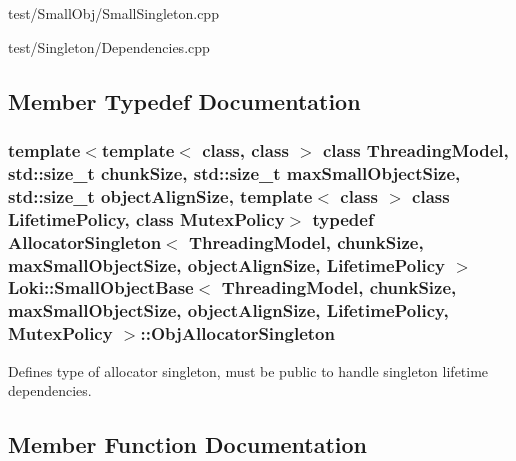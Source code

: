 \begin{DoxyItemize}
\item test/\+Small\+Obj/\+Small\+Singleton.\+cpp
\item test/\+Singleton/\+Dependencies.\+cpp 
\end{DoxyItemize}

\subsection{Member Typedef Documentation}
\hypertarget{classLoki_1_1SmallObjectBase_ad07df1c9ec9c41580e07e32eddcda82d}{}
\subsubsection[{Obj\+Allocator\+Singleton}]{\setlength{\rightskip}{0pt plus 5cm}template$<$template$<$ class, class $>$ class Threading\+Model, std\+::size\+\_\+t chunk\+Size, std\+::size\+\_\+t max\+Small\+Object\+Size, std\+::size\+\_\+t object\+Align\+Size, template$<$ class $>$ class Lifetime\+Policy, class Mutex\+Policy$>$ typedef {\bf Allocator\+Singleton}$<$ Threading\+Model, chunk\+Size, max\+Small\+Object\+Size, object\+Align\+Size, Lifetime\+Policy $>$ {\bf Loki\+::\+Small\+Object\+Base}$<$ Threading\+Model, chunk\+Size, max\+Small\+Object\+Size, object\+Align\+Size, Lifetime\+Policy, Mutex\+Policy $>$\+::{\bf Obj\+Allocator\+Singleton}}\label{classLoki_1_1SmallObjectBase_ad07df1c9ec9c41580e07e32eddcda82d}
Defines type of allocator singleton, must be public to handle singleton lifetime dependencies. 

\subsection{Member Function Documentation}
\hypertarget{classLoki_1_1SmallObjectBase_ab835d84fa8bc1ed3a558dc2e7a7e39ec}{}
